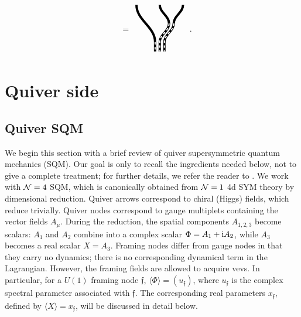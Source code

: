 \documentclass[10pt]{article}
\theoremstyle{definition}
\def\I{{\rm i}}
\def\CN {{\cal N}}
\def\ff{\mathfrak{f}}
\numberwithin{equation}{section}
\begin{document}
\begin{equation}
\begin{array}{c}
\begin{tikzpicture}[yscale=-0.8]
	\end{tikzpicture}
	\end{array}=\begin{array}{c}
	\begin{tikzpicture}[yscale=-0.8, xscale=-1]
		\draw[line width = 1mm] (-1,-2) to[out=90,in=270] (-0.6,-1) to[out=90,in=270] (-0.2,0) -- (-0.2,0.5);
		\draw[line width = 1mm] (0,-2) to[out=90,in=270] (-0.4,-1) to[out=90,in=270] (0,0) -- (0,0.5);
		\draw[line width = 1mm] (1,-2) to[out=90,in=270] (0.2,0) -- (0.2,0.5);
		\draw[dashed, white, line width =0.5mm] (-0.6,-1) to[out=90,in=270] (-0.2,0) -- (-0.2,0.5) (-0.4,-1) to[out=90,in=270] (0,0) -- (0,0.5) (0.2,0) -- (0.2,0.5);
	\end{tikzpicture}
	\end{array}\,.
\end{equation}



\section{Quiver side}\label{sec:quiver}



\subsection{Quiver SQM}\label{sec:QSQM}

We begin this section with a brief review of quiver supersymmetric quantum mechanics (SQM). 
Our goal is only to recall the ingredients needed below, not to give a complete treatment; for further details, we refer the reader to \cite{Li:2020rij,Galakhov:2020vyb,Li:2023zub,Galakhov:2024bzs}.
We work with $\CN=4$ SQM, which is canonically obtained from $\CN=1$ 4d SYM theory by dimensional reduction.
Quiver arrows correspond to chiral (Higgs) fields, which reduce trivially.
Quiver nodes correspond to gauge multiplets containing the vector fields $A_{\mu}$.
During the reduction, the spatial components $A_{1,2,3}$ become scalars: $A_1$ and $A_2$ combine into a complex scalar $\Phi=A_1+\I A_2$, while $A_3$ becomes a real scalar $X=A_3$.
Framing nodes differ from gauge nodes in that they carry no dynamics; there is no corresponding dynamical term in the Lagrangian.
However, the framing fields are allowed to acquire vevs.
In particular, for a $U(1)$ framing node $\ff$, $\langle\Phi\rangle=\left(u_{\ff}\right)$, where $u_{\ff}$ is the complex spectral parameter associated with $\ff$.
The corresponding real parameters $x_{\ff}$, defined by $\langle X\rangle=x_{\ff}$, will be discussed in detail below.
\end{document}
